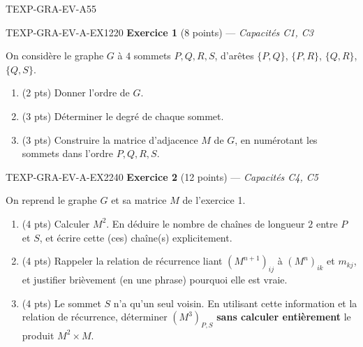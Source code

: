 \begin{evaluation}{TEXP-GRA-EV-A}{55}

\begin{exercice}{TEXP-GRA-EV-A-EX1}{2}{20}
\textbf{Exercice 1} (8 points) --- \textit{Capacités C1, C3}

\medskip

On considère le graphe $G$ à $4$ sommets $P,Q,R,S$, d'arêtes $\{P,Q\}$, $\{P,R\}$, $\{Q,R\}$, $\{Q,S\}$.

\begin{enumerate}
  \item (2 pts) Donner l'ordre de $G$.
  \item (3 pts) Déterminer le degré de chaque sommet.
  \item (3 pts) Construire la matrice d'adjacence $M$ de $G$, en numérotant les sommets dans l'ordre $P,Q,R,S$.
\end{enumerate}
\end{exercice}

\begin{exercice}{TEXP-GRA-EV-A-EX2}{2}{40}
\textbf{Exercice 2} (12 points) --- \textit{Capacités C4, C5}

\medskip

On reprend le graphe $G$ et sa matrice $M$ de l'exercice 1.

\begin{enumerate}
  \item (4 pts) Calculer $M^2$. En déduire le nombre de chaînes de longueur $2$ entre $P$ et $S$, et écrire cette (ces) chaîne(s) explicitement.
  \item (4 pts) Rappeler la relation de récurrence liant $(M^{n+1})_{ij}$ à $(M^n)_{ik}$ et $m_{kj}$, et justifier brièvement (en une phrase) pourquoi elle est vraie.
  \item (4 pts) Le sommet $S$ n'a qu'un seul voisin. En utilisant cette information et la relation de récurrence, déterminer $(M^3)_{P,S}$ \textbf{sans calculer entièrement} le produit $M^2\times M$.
\end{enumerate}
\end{exercice}

\end{evaluation}
